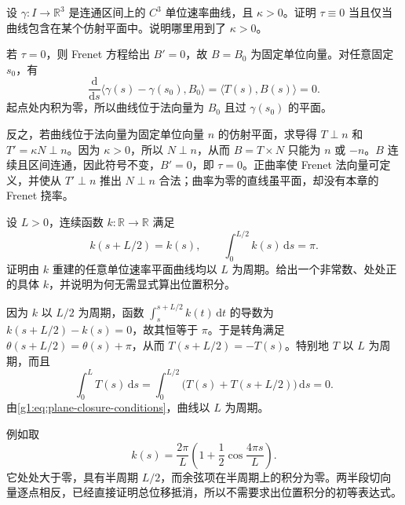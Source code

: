 \begin{exercise}
	\label{g1:ex:zero-torsion-planarity}
	设 \(\gamma\colon I\rightarrow\mathbb R^3\) 是连通区间上的 \(C^3\) 单位速率曲线，且 \(\kappa>0\)。证明 \(\tau\equiv0\) 当且仅当曲线包含在某个仿射平面中。说明哪里用到了 \(\kappa>0\)。
\end{exercise}
\begin{solution}
	若 \(\tau=0\)，则 Frenet 方程给出 \(B'=0\)，故 \(B=B_0\) 为固定单位向量。对任意固定 \(s_0\)，有
	\[
		\frac{\mathrm{d}}{\mathrm{d}s}\langle\gamma(s)-\gamma(s_0),B_0\rangle
		=\langle T(s),B(s)\rangle=0.
	\]
	起点处内积为零，所以曲线位于法向量为 \(B_0\) 且过 \(\gamma(s_0)\) 的平面。

	反之，若曲线位于法向量为固定单位向量 \(n\) 的仿射平面，求导得 \(T\perp n\) 和 \(T'=\kappa N\perp n\)。因为 \(\kappa>0\)，所以 \(N\perp n\)，从而 \(B=T\times N\) 只能为 \(n\) 或 \(-n\)。\(B\) 连续且区间连通，因此符号不变，\(B'=0\)，即 \(\tau=0\)。正曲率使 Frenet 法向量可定义，并使从 \(T'\perp n\) 推出 \(N\perp n\) 合法；曲率为零的直线虽平面，却没有本章的 Frenet 挠率。
\end{solution}

\begin{exercise}
	\label{g1:ex:half-period-curvature}
	设 \(L>0\)，连续函数 \(k\colon\mathbb R\rightarrow\mathbb R\) 满足
	\[
		k(s+L/2)=k(s),\qquad \int_0^{L/2}k(s)\,\mathrm{d}s=\pi.
	\]
	证明由 \(k\) 重建的任意单位速率平面曲线均以 \(L\) 为周期。给出一个非常数、处处正的具体 \(k\)，并说明为何无需显式算出位置积分。
\end{exercise}
\begin{solution}
	因为 \(k\) 以 \(L/2\) 为周期，函数 \(\int_s^{s+L/2}k(t)\,\mathrm{d}t\) 的导数为 \(k(s+L/2)-k(s)=0\)，故其恒等于 \(\pi\)。于是转角满足 \(\theta(s+L/2)=\theta(s)+\pi\)，从而 \(T(s+L/2)=-T(s)\)。特别地 \(T\) 以 \(L\) 为周期，而且
	\[
		\int_0^L T(s)\,\mathrm{d}s
		=\int_0^{L/2}\bigl(T(s)+T(s+L/2)\bigr)\,\mathrm{d}s=0.
	\]
	由\eqref{g1:eq:plane-closure-conditions}，曲线以 \(L\) 为周期。

	例如取
	\[
		k(s)=\frac{2\pi}{L}\left(1+\frac12\cos\frac{4\pi s}{L}\right).
	\]
	它处处大于零，具有半周期 \(L/2\)，而余弦项在半周期上的积分为零。两半段切向量逐点相反，已经直接证明总位移抵消，所以不需要求出位置积分的初等表达式。
\end{solution}


